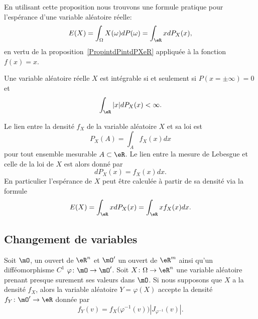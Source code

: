 En utilisant cette proposition nous trouvons une formule pratique pour l'espérance d'une variable aléatoire réelle:
\begin{equation}
	E(X)=\int_{\Omega}X(\omega)dP(\omega)=\int_{\eR}xdP_X(x),
\end{equation}
en vertu de la proposition~\ref{PropintdPintdPXeR} appliquée à la fonction \( f(x)=x\).

\begin{proposition}
	Une variable aléatoire réelle \( X\) est intégrable si et seulement si \( P(x=\pm\infty)=0\) et
	\begin{equation}
		\int_{\eR}| x |dP_X(x)<\infty.
	\end{equation}
\end{proposition}

Le lien entre la densité \( f_X\) de la variable aléatoire \( X\) et sa loi est
\begin{equation}
	P_X(A)=\int_Af_X(x)dx
\end{equation}
pour tout ensemble mesurable \( A\subset\eR\). Le lien entre la mesure de Lebesgue et celle de la loi de \( X\) est alors donné par
\begin{equation}
	dP_X(x)=f_X(x)dx.
\end{equation}
En particulier l'espérance de \( X\) peut être calculée à partir de sa densité via la formule
\begin{equation}        \label{EqEspDensform}
	E(X)=\int_{\eR}xdP_X(x)=\int_{\eR}x f_X(x)dx.
\end{equation}

\subsection{Changement de variables}

\begin{theorem}
	Soit \( \mO\), un ouvert de \( \eR^n\) et \( \mO'\) un ouvert de \( \eR^m\) ainsi qu'un difféomorphisme \( C^1\) \( \varphi\colon \mO\to \mO'\). Soit \( X\colon \Omega\to \eR^n\) une variable aléatoire prenant presque surement ses valeurs dans \( \mO\). Si nous supposons que \( X\) a la densité \( f_X\), alors la variable aléatoire \( Y=\varphi(X)\) accepte la densité \( f_Y\colon \mO'\to \eR\) donnée par
	\begin{equation}
		f_Y(v)=f_X\big( \varphi^{-1}(v) \big)| J_{\varphi^{-1}}(v) |.
	\end{equation}
\end{theorem}


